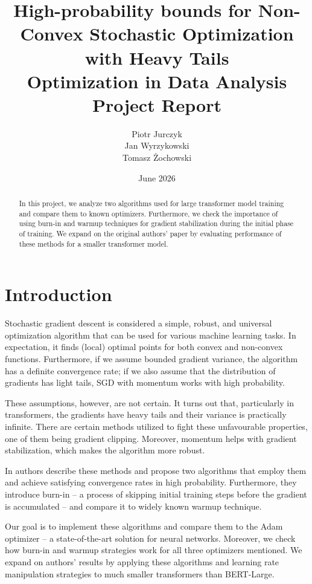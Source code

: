 \documentclass{article}
\title{High-probability bounds for Non-Convex Stochastic Optimization with Heavy Tails\\Optimization in Data Analysis Project Report}
\author{Piotr Jurczyk\\Jan Wyrzykowski\\Tomasz Żochowski}
\date{June 2026}
\begin{document}
\maketitle

\begin{abstract}
   In this project, we analyze two algorithms used for large transformer model training and compare them to known optimizers. Furthermore, we check the importance of using burn-in and warmup techniques for gradient stabilization during the initial phase of training. We expand on the original authors' paper by evaluating performance of these methods for a smaller transformer model.
\end{abstract}

\tableofcontents

\newpage

\section{Introduction}

Stochastic gradient descent is considered a simple, robust, and universal optimization algorithm that can be used for various machine learning tasks. In expectation, it finds (local) optimal points for both convex and non-convex functions. Furthermore, if we assume bounded gradient variance, the algorithm has a definite convergence rate; if we also assume that the distribution of gradients has light tails, SGD with momentum works with high probability.

These assumptions, however, are not certain. It turns out that, particularly in transformers, the gradients have heavy tails and their variance is practically infinite. There are certain methods utilized to fight these unfavourable properties, one of them being gradient clipping. Moreover, momentum helps with gradient stabilization, which makes the algorithm more robust.

In \cite{heavy-tails} authors describe these methods and propose two algorithms that employ them and achieve satisfying convergence rates in high probability. Furthermore, they introduce burn-in -- a process of skipping initial training steps before the gradient is accumulated -- and compare it to widely known warmup technique.

Our goal is to implement these algorithms and compare them to the Adam optimizer -- a state-of-the-art solution for neural networks. Moreover, we check how burn-in and warmup strategies work for all three optimizers mentioned. We expand on authors' results by applying these algorithms and learning rate manipulation strategies to much smaller transformers than BERT-Large.
\end{document}
